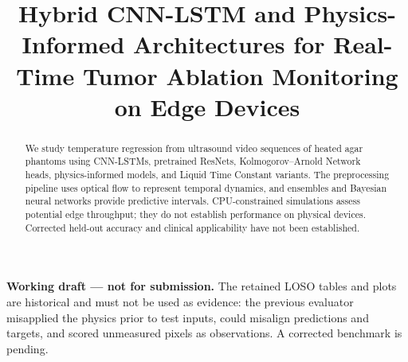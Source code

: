 \documentclass[conference]{IEEEtran}
\begin{document}
\title{Hybrid CNN-LSTM and Physics-Informed Architectures for Real-Time Tumor Ablation Monitoring on Edge Devices}

\author{
\and
{}
\and
{}
\and
{}
}

\maketitle

\noindent\textbf{Working draft --- not for submission.}
The retained LOSO tables and plots are historical and must not be used as evidence:
the previous evaluator misapplied the physics prior to test inputs, could
misalign predictions and targets, and scored unmeasured pixels as observations.
A corrected benchmark is pending.

\begin{abstract}
We study temperature regression from ultrasound video sequences of heated
agar phantoms using CNN-LSTMs, pretrained ResNets, Kolmogorov--Arnold Network
heads, physics-informed models, and Liquid Time Constant variants. The
preprocessing pipeline uses optical flow to represent temporal dynamics, and
ensembles and Bayesian neural networks provide predictive intervals.
CPU-constrained simulations assess potential edge throughput; they do not
establish performance on physical devices. Corrected held-out accuracy and
clinical applicability have not been established.
\end{abstract}
\end{document}
